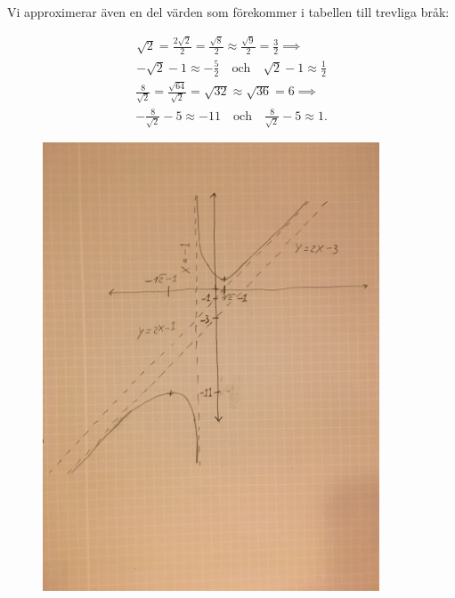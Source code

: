 \documentclass{article}
\begin{document}
\newpage

\noindent Vi approximerar även en del värden som förekommer i tabellen till trevliga bråk:

\begin{gather*}
  \sqrt{2} = \frac{2\sqrt{2}}{2} = \frac{\sqrt{8}}{2} \approx \frac{\sqrt{9}}{2} = \frac{3}{2} \implies\\
  -\sqrt{2} - 1 \approx -\frac{5}{2} \quad \text{och} \quad \sqrt{2} - 1 \approx \frac{1}{2}
\end{gather*}\begin{gather*}
  \frac{8}{\sqrt{2}} = \frac{\sqrt{64}}{\sqrt{2}} = \sqrt{32} \approx \sqrt{36} = 6 \implies\\
  -\frac{8}{\sqrt{2}} - 5 \approx -11 \quad \text{och} \quad \frac{8}{\sqrt{2}} - 5 \approx 1\text{.}
\end{gather*}

\begin{figure}[h]
  \centering
  \includegraphics[width=10cm, angle=270]{skiss.jpg}
\end{figure}
\end{document}

